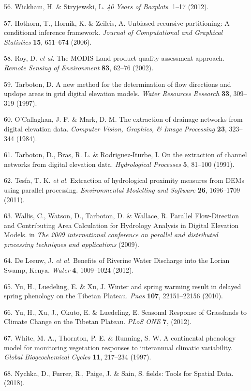 \documentclass[12pt,oneside]{article}
\begin{document}
\leavevmode\hypertarget{ref-Wickham_and_Stryjewski_2012}{}%
56. Wickham, H. \& Stryjewski, L. \emph{40 Years of Boxplots}. 1--17 (2012).

\leavevmode\hypertarget{ref-Hothorn_et_al_2006}{}%
57. Hothorn, T., Hornik, K. \& Zeileis, A. Unbiased recursive partitioning: A conditional inference framework. \emph{Journal of Computational and Graphical Statistics} \textbf{15}, 651--674 (2006).

\leavevmode\hypertarget{ref-Roy_et_al_2002}{}%
58. Roy, D. \emph{et al.} The MODIS Land product quality assessment approach. \emph{Remote Sensing of Environment} \textbf{83}, 62--76 (2002).

\leavevmode\hypertarget{ref-Tarboton_1997}{}%
59. Tarboton, D. A new method for the determination of flow directions and upslope areas in grid digital elevation models. \emph{Water Resources Research} \textbf{33}, 309--319 (1997).

\leavevmode\hypertarget{ref-OCallaghan_Mark_1984}{}%
60. O'Callaghan, J. F. \& Mark, D. M. The extraction of drainage networks from digital elevation data. \emph{Computer Vision, Graphics, \& Image Processing} \textbf{23}, 323--344 (1984).

\leavevmode\hypertarget{ref-Tarboton_et_al_1991}{}%
61. Tarboton, D., Bras, R. L. \& Rodriguez‐Iturbe, I. On the extraction of channel networks from digital elevation data. \emph{Hydrological Processes} \textbf{5}, 81--100 (1991).

\leavevmode\hypertarget{ref-Tesfa_et_al_2011}{}%
62. Tesfa, T. K. \emph{et al.} Extraction of hydrological proximity measures from DEMs using parallel processing. \emph{Environmental Modelling and Software} \textbf{26}, 1696--1709 (2011).

\leavevmode\hypertarget{ref-Wallis_et_al_2009}{}%
63. Wallis, C., Watson, D., Tarboton, D. \& Wallace, R. Parallel Flow-Direction and Contributing Area Calculation for Hydrology Analysis in Digital Elevation Models. in \emph{The 2009 international conference on parallel and distributed processing techniques and applications} (2009).

\leavevmode\hypertarget{ref-DeLeeuw_et_al_2012}{}%
64. De Leeuw, J. \emph{et al.} Benefits of Riverine Water Discharge into the Lorian Swamp, Kenya. \emph{Water} \textbf{4}, 1009--1024 (2012).

\leavevmode\hypertarget{ref-Yu_et_al_2010}{}%
65. Yu, H., Luedeling, E. \& Xu, J. Winter and spring warming result in delayed spring phenology on the Tibetan Plateau. \emph{Pnas} \textbf{107}, 22151--22156 (2010).

\leavevmode\hypertarget{ref-Yu_et_al_2012}{}%
66. Yu, H., Xu, J., Okuto, E. \& Luedeling, E. Seasonal Response of Grasslands to Climate Change on the Tibetan Plateau. \emph{PLoS ONE} \textbf{7}, (2012).

\leavevmode\hypertarget{ref-White_et_al_1997}{}%
67. White, M. A., Thornton, P. E. \& Running, S. W. A continental phenology model for monitoring vegetation responses to interannual climatic variability. \emph{Global Biogeochemical Cycles} \textbf{11}, 217--234 (1997).

\leavevmode\hypertarget{ref-Nychka_et_al_2018}{}%
68. Nychka, D., Furrer, R., Paige, J. \& Sain, S. fields: Tools for Spatial Data. (2018).
\end{document}
